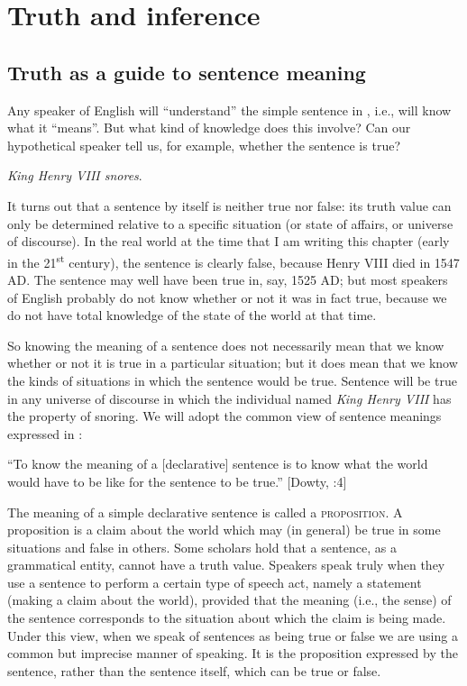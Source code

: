 \chapter{Truth and inference}\label{sec:3}

\section{Truth as a guide to sentence meaning}\label{sec:3.1}

Any speaker of English will “understand” the simple sentence in , i.e., will know what it “means”. But what kind of knowledge does this involve? Can our hypothetical speaker tell us, for example, whether the sentence is true?


\ea \label{ex:3.1}
\textit{King Henry VIII snores}.
\z


It turns out that a sentence by itself is neither true nor false: its truth value can only be determined relative to a specific situation (or state of affairs, or universe of discourse). In the real world at the time that I am writing this chapter (early in the 21\textsuperscript{st} century), the sentence is clearly false, because Henry VIII died in 1547 AD. The sentence may well have been true in, say, 1525 AD; but most speakers of English probably do not know whether or not it was in fact true, because we do not have total knowledge of the state of the world at that time.



So knowing the meaning of a sentence does not necessarily mean that we know whether or not it is true in a particular situation; but it does mean that we know the kinds of situations in which the sentence would be true. Sentence  will be true in any universe of discourse in which the individual named \textit{King Henry VIII} has the property of snoring. We will adopt the common view of sentence meanings expressed in :


\ea \label{ex:3.2}
“To know the meaning of a [declarative] sentence is to know what the world would have to be like for the sentence to be true.”  [Dowty, \citealt{WallPeters1981}:4]
\z


The meaning of a simple declarative sentence is called a \textsc{proposition}. A proposition is a claim about the world which may (in general) be true in some situations and false in others. Some scholars hold that a sentence, as a grammatical entity, cannot have a truth value. Speakers speak truly when they use a sentence to perform a certain type of speech act, namely a statement (making a claim about the world), provided that the meaning (i.e., the sense) of the sentence corresponds to the situation about which the claim is being made. Under this view, when we speak of sentences as being true or false we are using a common but imprecise manner of speaking. It is the proposition expressed by the sentence, rather than the sentence itself, which can be true or false.



